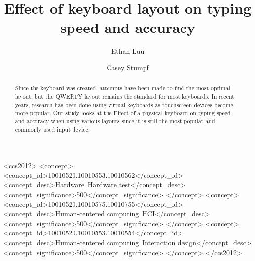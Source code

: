 \documentclass[manuscript,screen,review]{acmart}
\begin{document}
\title{Effect of keyboard layout on typing speed and accuracy}

\author{Ethan Luu}

\author{Casey Stumpf}


\renewcommand{\shortauthors}{Luu and Stumpf}

\begin{abstract}
    Since the keyboard was created, attempts have been made to find the most optimal layout, but the QWERTY layout remains the standard for most keyboards. In recent years, research has been done using virtual keyboards as touchscreen devices become more popular. Our study looks at the Effect of a physical keyboard on typing speed and accuracy when using various layouts since it is still the most popular and commonly used input device. 
\end{abstract}

\begin{CCSXML}
<ccs2012>
 <concept>
  <concept_id>10010520.10010553.10010562</concept_id>
  <concept_desc>Hardware~Hardware test</concept_desc>
  <concept_significance>500</concept_significance>
 </concept>
 <concept>
  <concept_id>10010520.10010575.10010755</concept_id>
  <concept_desc>Human-centered computing~HCI</concept_desc>
  <concept_significance>500</concept_significance>
 </concept>
 <concept>
  <concept_id>10010520.10010553.10010554</concept_id>
  <concept_desc>Human-centered computing~Interaction design</concept_desc>
  <concept_significance>500</concept_significance>
 </concept>
</ccs2012>
\end{CCSXML}



\maketitle
\end{document}
